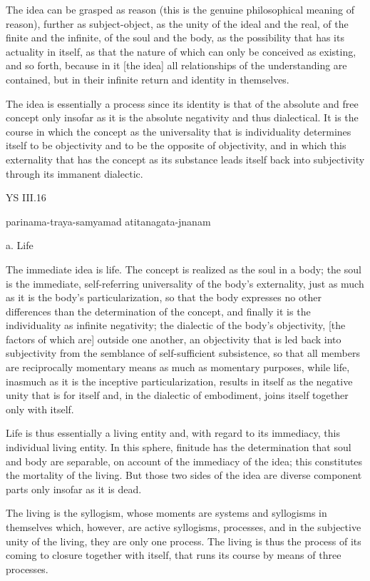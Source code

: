 The idea can be grasped as reason
(this is the genuine philosophical meaning of reason),
further as subject-object, as the unity of the ideal and the real,
of the finite and the infinite, of the soul and the body,
as the possibility that has its actuality in itself,
as that the nature of which can only be conceived as existing,
and so forth, because in it [the idea] all relationships of
the understanding are contained,
but in their infinite return and identity in themselves.

The idea is essentially a process since its identity is
that of the absolute and free concept only insofar as
it is the absolute negativity and thus dialectical.
It is the course in which the concept as the universality that is individuality
determines itself to be objectivity and to be the opposite of objectivity,
and in which this externality that has the concept as its substance leads
itself back into subjectivity through its immanent dialectic.

YS III.16

parinama-traya-samyamad atitanagata-jnanam

a. Life

The immediate idea is life.
The concept is realized as the soul in a body;
the soul is the immediate, self-referring universality of the body's externality,
just as much as it is the body's particularization, so that the body expresses
no other differences than the determination of the concept, and finally
it is the individuality as infinite negativity;
the dialectic of the body's objectivity,
[the factors of which are] outside one another,
an objectivity that is led back into subjectivity from the semblance of self-sufficient
subsistence, so that all members are reciprocally momentary means as
much as momentary purposes, while life, inasmuch as it is the inceptive
particularization, results in itself as the negative unity that is for itself and,
in the dialectic of embodiment, joins itself together only with itself.

Life is thus essentially a living entity and, with regard to its immediacy,
this individual living entity.
In this sphere, finitude has the determination that soul and body are separable,
on account of the immediacy of the idea;
this constitutes the mortality of the living.
But those two sides of the idea are diverse component parts
only insofar as it is dead.

The living is the syllogism, whose moments are systems and syllogisms
in themselves which, however, are active syllogisms, processes, and
in the subjective unity of the living, they are only one process.
The living is thus the process of its coming to closure together with itself,
that runs its course by means of three processes.

